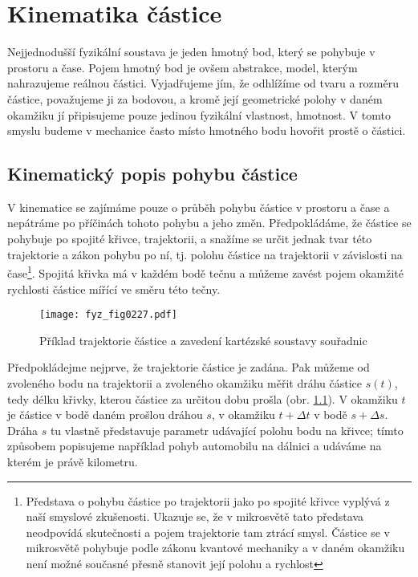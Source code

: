 \setchaptertoc
\chapter{Kinematika částice}

  Nejjednodušší fyzikální soustava je jeden hmotný bod, který se pohybuje v prostoru a čase. Pojem
  hmotný bod je ovšem abstrakce, model, kterým nahrazujeme reálnou částici. Vyjadřujeme jím, že
  odhlížíme od tvaru a rozměru částice, považujeme ji za bodovou, a kromě její geometrické polohy v
  daném okamžiku jí připisujeme pouze jedinou fyzikální vlastnost, hmotnost. V tomto smyslu budeme
  v mechanice často místo hmotného bodu hovořit prostě o částici.
  \section{Kinematický popis pohybu částice}
    V kinematice se zajímáme pouze o průběh pohybu částice v prostoru a čase a nepátráme po
    příčinách tohoto pohybu a jeho změn. Předpokládáme, že částice se pohybuje po spojité křivce,
    trajektorii, a snažíme se určit jednak tvar této trajektorie a zákon pohybu po ní, tj. polohu
    částice na trajektorii v závislosti na čase\footnote{Představa o pohybu částice po trajektorii
    jako po spojité křivce vyplývá z naší smyslové zkušenosti. Ukazuje se, že v mikrosvětě tato
    představa neodpovídá skutečnosti a pojem trajektorie tam ztrácí smysl. Částice se v mikrosvětě
    pohybuje podle zákonu kvantové mechaniky a v daném okamžiku není možné současné přesně stanovit
    její polohu a rychlost}. Spojitá křivka má v každém bodě tečnu a můžeme zavést pojem okamžité
    rychlosti částice mířící ve směru této tečny.
  
    \begin{figure}[ht!]
      \centering
      \texttt{[image: fyz\_fig0227.pdf]}
      \caption{Příklad trajektorie částice a zavedení kartézské soustavy souřadnic}
      \label{fyz:fig0227}
    \end{figure}
  
    Předpokládejme nejprve, že trajektorie částice je zadána. Pak můžeme od zvoleného bodu na
    trajektorii a zvoleného okamžiku měřit dráhu částice $s(t)$, tedy délku křivky, kterou částice
    za určitou dobu prošla (obr. \ref{fyz:fig0227}). V okamžiku $t$ je částice v bodě daném
    prošlou dráhou $s$, v okamžiku $t + \Delta t$ v bodě $s + \Delta s$. Dráha $s$ tu vlastně
    představuje parametr udávající polohu bodu na křivce; tímto způsobem popisujeme například pohyb
    automobilu na dálnici a udáváme na kterém je právě kilometru.
  

